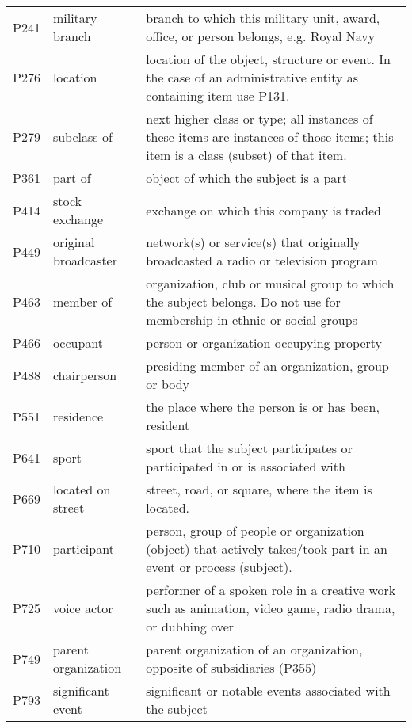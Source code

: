 \documentclass[11pt]{article}
\begin{document}
\begin{table*}[!t]
{\begin{tabular}{lll}
P241 & military branch & branch to which this military unit, award, office, or person belongs, e.g. Royal Navy \\                             
P276 & location & location of the object, structure or event. In the case of an administrative entity as containing item use P131. \\
P279 & subclass of & next higher class or type; all instances of these items are instances of those items; this item is a class (subset) of that item. \\
P361 & part of & object of which the subject is a part \\
P414 & stock exchange & exchange on which this company is traded \\
P449 & original broadcaster & network(s) or service(s) that originally broadcasted a radio or television program \\
P463 & member of & organization, club or musical group to which the subject belongs. Do not use for membership in ethnic or social groups \\
P466 & occupant & person or organization occupying property \\
    P488 & chairperson & presiding member of an organization, group or body \\                                                                                
P551 & residence & the place where the person is or has been, resident \\                                                                                 
P641 & sport & sport that the subject participates or participated in or is associated with \\
P669 & located on street & street, road, or square, where the item is located. \\                                                                                                          
P710 & participant & person, group of people or organization (object) that actively takes/took part in an event or process (subject). \\                                      
P725 & voice actor & performer of a spoken role in a creative work such as animation, video game, radio drama, or dubbing over \\               
P749 & parent organization & parent organization of an organization, opposite of subsidiaries (P355) \\
P793 & significant event & significant or notable events associated with the subject \\

\end{tabular}}
\end{table*}
\end{document}
